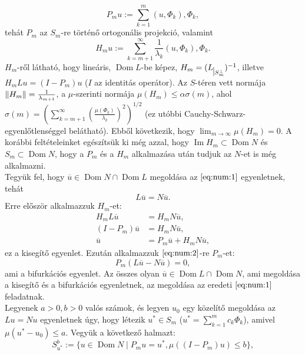 \documentclass[oneside, titlepage, 12pt, a4paper]{report}
\DeclareMathOperator{\Ima}{Im}	%
\DeclareMathOperator{\Dom}{Dom}	%
\DeclarePairedDelimiter\norm{\lVert}{\rVert}	%
\begin{document}
\begin{equation*}
P_m u := \sum_{k = 1}^m (u, \Phi_k), \Phi_k,
\end{equation*}
tehát $P_m$ az $S_m$-re történő ortogonális projekció, valamint
\begin{equation*}
H_m u := \sum_{k = m + 1}^\infty \frac{1}{\lambda_k} (u, \Phi_k), \Phi_k.
\end{equation*}
$H_m$-ről látható, hogy lineáris, $\Dom L$-be képez, $H_m = (L_{\mkern 1mu \vrule height 2ex\mkern2mu S_m^\perp})^{-1}$, illetve $H_mLu = (I - P_m)u$ ($I$ az identitás operátor). Az $S$-téren vett normája $\norm{H_m} = \frac{1}{\lambda_{m+1}}$, a $\mu$-szerinti normája $\mu(H_m) \leq \alpha \sigma(m)$, ahol $\sigma(m) = \left(\sum_{k = m+1}^\infty \left( \frac{\mu(\Phi_k)}{\lambda_k}\right)^2\right)^{1/2}$ (ez utóbbi Cauchy-Schwarz-egyenlőtlenséggel belátható). Ebből következik, hogy $\lim_{m \to \infty} \mu(H_m) = 0$. A korábbi feltételeinket egészítsük ki még azzal, hogy $\Ima H_m \subset \Dom N$ és $S_m \subset \Dom N$, hogy a $P_m$ és a $H_m$ alkalmazása után tudjuk az $N$-et is még alkalmazni. \\
Tegyük fel, hogy $\overline{u} \in \Dom N \cap \Dom L$ megoldása az $\eqref{eq:num:1}$ egyenletnek, tehát
\begin{equation}
L\overline{u} = N\overline{u}. \label{eq:num:2}
\end{equation}
Erre először alkalmazzuk $H_m$-et:
\begin{align}
H_m L \overline{u} &= H_m N \overline{u}, \nonumber \\
(I - P_m) \overline{u} &= H_m N \overline{u}, \nonumber \\
\overline{u} &= P_m \overline{u} + H_m N \overline{u}, \label{eq:num:3}
\end{align}
ez a kisegítő egyenlet. Ezután alkalmazzuk $\eqref{eq:num:2}$-re $P_m$-et: %
\begin{equation*}
P_m(L \overline{u} - N \overline{u}) = 0,
\end{equation*}
ami a bifurkációs egyenlet. Az összes olyan $\overline{u} \in \Dom L \cap \Dom N$, ami megoldása a kisegítő és a bifurkációs egyenletnek, az megoldása az eredeti $\eqref{eq:num:1}$ feladatnak. \\ %
Legyenek $a > 0, b > 0$ valós számok, és legyen $u_0$ egy közelítő megoldása az $Lu = Nu$ egyenletnek úgy, hogy létezik $u^* \in S_m$ ($u^* = \sum_{k=1}^m c_k \Phi_k$), amivel $\mu(u^* - u_0) \leq a$. Vegyük a következő halmazt:
\begin{equation*}
S_{u^*}^b := \{ u \in \Dom N \; | \; P_m u = u^*, \mu((I - P_m)u) \leq b \},
\end{equation*}
\end{document}
